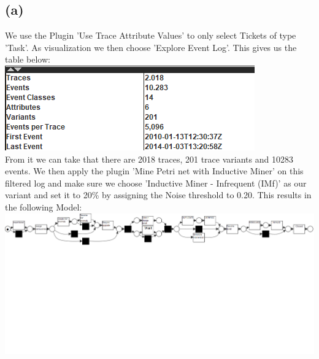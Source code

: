 \documentclass[../../main.tex]{subfiles}
\begin{document}
\subsection*{(a)}
We use the Plugin 'Use Trace Attribute Values' to only select Tickets of type 'Task'. As visualization we then choose 'Explore Event Log'.
This gives us the table below:\\
\includegraphics[width=0.5\columnwidth]{img/ProM_a_traces.png}\\
From it we can take that there are 2018 traces, 201 trace variants and 10283 events. We then apply the plugin 'Mine Petri net with Inductive Miner' on this filtered log and make sure we choose 'Inductive Miner - Infrequent (IMf)' as our variant and set it to 20\% by assigning the Noise threshold to 0.20. This results in the following Model:\\
\includegraphics[width=\columnwidth]{img/ProM_a_inductive_miner.png}
\end{document}
